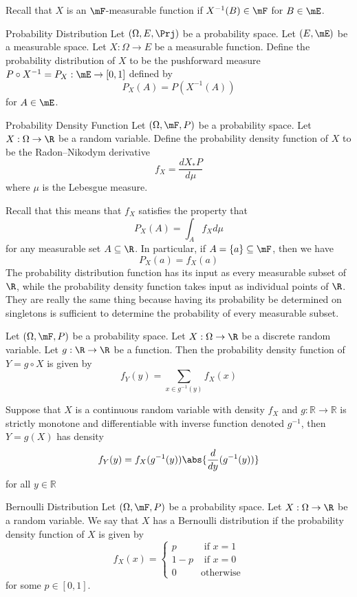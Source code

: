 \documentclass[a4paper]{article}
\begin{document}
Recall that $X$ is an $\mF$-measurable function if $X^{-1}(B)\in\mF$ for $B\in\mE$. 

\begin{defn}{Probability Distribution}{} Let $(\Omega,E,\Prj)$ be a probability space. Let $(E,\mE)$ be a measurable space. Let $X:\Omega\to E$ be a measurable function. Define the probability distribution of $X$ to be the pushforward measure $P\circ X^{-1}=P_X:\mE\to[0,1]$ defined by $$P_X(A)=P(X^{-1}(A))$$ for $A\in\mE$. 
\end{defn}

\begin{defn}{Probability Density Function}{} Let $(\Omega,\mF,P)$ be a probability space. Let $X:\Omega\to\R$ be a random variable. Define the probability density function of $X$ to be the Radon–Nikodym derivative $$f_X=\frac{d X_\ast P}{d\mu}$$ where $\mu$ is the Lebesgue measure. 
\end{defn}

Recall that this means that $f_X$ satisfies the property that $$P_X(A)=\int_A f_X d\mu$$ for any measurable set $A\subseteq\R$. In particular, if $A=\{a\}\subseteq\mF$, then we have $$P_X(a)=f_X(a)$$ The probability distribution function has its input as every measurable subset of $\R$, while the probability density function takes input as individual points of $\R$. They are really the same thing because having its probability be determined on singletons is sufficient to determine the probability of every measurable subset. 

\begin{prp}{}{} Let $(\Omega,\mF,P)$ be a probability space. Let $X:\Omega\to\R$ be a discrete random variable. Let $g:\R\to\R$ be a function. Then the probability density function of $Y=g\circ X$ is given by $$f_Y(y)=\sum_{x\in g^{-1}(y)}f_X(x)$$
\end{prp}

\begin{prp}{}{} Suppose that $X$ is a continuous random variable with density $f_X$ and $g:\mathbb{R}\to\mathbb{R}$ is strictly monotone and differentiable with inverse function denoted $g^{-1}$, then $Y=g(X)$ has density $$f_Y(y)=f_X(g^{-1}(y))\abs{\frac{d}{dy}(g^{-1}(y))}$$ for all $y\in\mathbb{R}$
\end{prp}

\begin{eg}{Bernoulli Distribution}{} Let $(\Omega,\mF,P)$ be a probability space. Let $X:\Omega\to\R$ be a random variable. We say that $X$ has a Bernoulli distribution if the probability density function of $X$ is given by $$f_X(x)=\begin{cases}
p & \text{ if }x=1\\
1-p & \text{ if }x=0\\
0 & \text{otherwise}
\end{cases}$$ for some $p\in [0,1]$. 
\end{eg}
\end{document}

